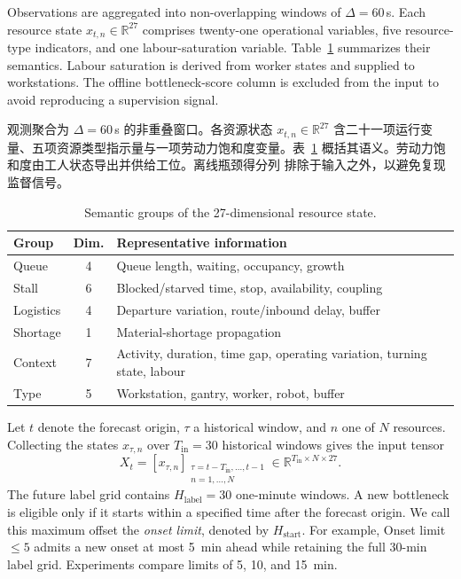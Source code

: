 \documentclass[a4paper,fleqn]{cas-dc}
\newcommand{\zhpara}[1]{%
  \par\begingroup\small\color{black!72}\noindent #1\par\endgroup}
\begin{document}
Observations are aggregated into non-overlapping windows of $\Delta=60$\,s. Each resource state $x_{t,n}\in\mathbb{R}^{27}$ comprises twenty-one operational variables, five resource-type indicators, and one labour-saturation variable. Table~\ref{tab:feature-groups} summarizes their semantics. Labour saturation is derived from worker states and supplied to workstations. The offline bottleneck-score column is excluded from the input to avoid reproducing a supervision signal.

\zhpara{观测聚合为 $\Delta=60$\,s 的非重叠窗口。各资源状态 $x_{t,n}\in\mathbb{R}^{27}$ 含二十一项运行变量、五项资源类型指示量与一项劳动力饱和度变量。表~\ref{tab:feature-groups} 概括其语义。劳动力饱和度由工人状态导出并供给工位。离线瓶颈得分列 排除于输入之外，以避免复现监督信号。}


\begin{table}[pos=t]
\centering
\caption{Semantic groups of the 27-dimensional resource state.}
\label{tab:feature-groups}
\scriptsize
\setlength{\tabcolsep}{3pt}
\renewcommand{\arraystretch}{1.12}
\begin{tabularx}{\columnwidth}{@{}l c >{\raggedright\arraybackslash}X@{}}
\toprule
Group & Dim. & Representative information \\
\midrule
Queue & 4 & Queue length, waiting, occupancy, growth \\
Stall & 6 & Blocked/starved time, stop, availability, coupling \\
Logistics & 4 & Departure variation, route/inbound delay, buffer \\
Shortage & 1 & Material-shortage propagation \\
Context & 7 & Activity, duration, time gap, operating variation, turning state, labour \\
Type & 5 & Workstation, gantry, worker, robot, buffer \\
\bottomrule
\end{tabularx}
\end{table}

Let $t$ denote the forecast origin, $\tau$ a historical window, and $n$ one of $N$ resources. Collecting the states $x_{\tau,n}$ over $T_{\mathrm{in}}=30$ historical windows gives the input tensor
\begin{equation}
X_t=\left[x_{\tau,n}\right]_
{\substack{\tau=t-T_{\mathrm{in}},\ldots,t-1\\n=1,\ldots,N}}
\in\mathbb{R}^{T_{\mathrm{in}}\times N\times 27}.
\end{equation}
The future label grid contains $H_{\mathrm{label}}=30$ one-minute windows. A new bottleneck is eligible only if it starts within a specified time after the forecast origin. We call this maximum offset the \emph{onset limit}, denoted by $H_{\mathrm{start}}$. For example, Onset limit~$\leq5$ admits a new onset at most 5~min ahead while retaining the full 30-min label grid. Experiments compare limits of 5, 10, and 15~min.
\end{document}
